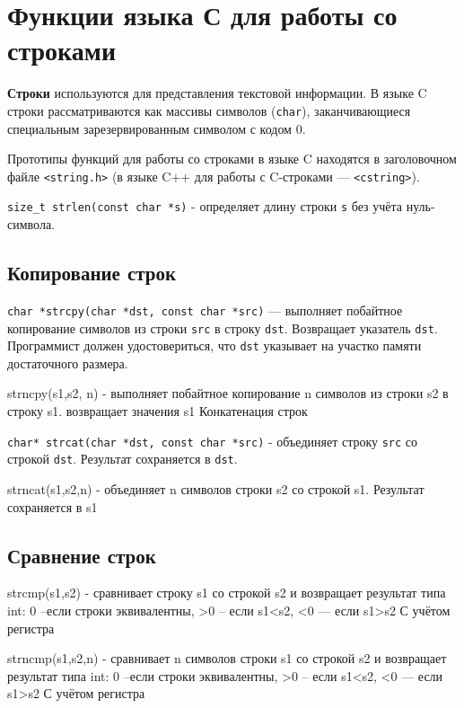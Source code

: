 \documentclass[14pt, a4paper]{extarticle}
\begin{document}
\section{Функции языка С для работы со строками}
\textbf{Строки} используются для представления текстовой информации.
В языке C строки рассматриваются как массивы символов (\verb|char|), заканчивающиеся
специальным зарезервированным символом с кодом 0.


Прототипы функций для работы со строками в языке C находятся в заголовочном файле \verb|<string.h>|
(в языке C++ для работы с C-строками --- \verb|<cstring>|).

\verb|size_t strlen(const char *s)| - определяет длину строки \verb|s| без учёта нуль-символа.

\subsection*{Копирование строк}

\verb|char *strcpy(char *dst, const char *src)| --- выполняет побайтное копирование символов из строки \verb|src|
в строку \verb|dst|. Возвращает указатель \verb|dst|. Программист должен удостовериться, что \verb|dst| указывает
на участко памяти достаточного размера.

strncpy(s1,s2, n) - выполняет побайтное копирование n символов из строки  s2 в строку s1. возвращает значения s1
Конкатенация строк

\verb|char* strcat(char *dst, const char *src)| - объединяет строку \verb|src| со строкой \verb|dst|.
Результат сохраняется в \verb|dst|. 

strncat(s1,s2,n) - объединяет n символов строки s2 со строкой s1. Результат сохраняется в s1
\subsection*{Сравнение строк}

strcmp(s1,s2) - сравнивает строку s1 со строкой s2 и возвращает результат типа int:
0 –если строки эквивалентны, >0 – если s1<s2,  <0  — если s1>s2 С учётом регистра

strncmp(s1,s2,n) - сравнивает n символов строки s1 со строкой s2 и возвращает результат типа int:
0 –если строки эквивалентны, >0 – если s1<s2,  <0  — если s1>s2 С учётом регистра
\end{document}
